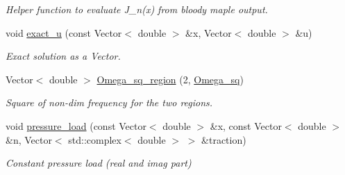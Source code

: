 \begin{DoxyCompactItemize}
\begin{DoxyCompactList}\small\item\em Helper function to evaluate J\+\_\+n(x) from bloody maple output. \end{DoxyCompactList}\item 
void \hyperlink{namespaceGlobal__Parameters_a97162dba4bd29a15067b9c9bbe53c754}{exact\+\_\+u} (const Vector$<$ double $>$ \&x, Vector$<$ double $>$ \&u)
\begin{DoxyCompactList}\small\item\em Exact solution as a Vector. \end{DoxyCompactList}\item 
Vector$<$ double $>$ \hyperlink{namespaceGlobal__Parameters_a58a76124a7c047adf58388cc12e84f23}{Omega\+\_\+sq\+\_\+region} (2, \hyperlink{namespaceGlobal__Parameters_af9e1e178dfb7f5e35b452599bd4c4324}{Omega\+\_\+sq})
\begin{DoxyCompactList}\small\item\em Square of non-\/dim frequency for the two regions. \end{DoxyCompactList}\item 
void \hyperlink{namespaceGlobal__Parameters_a0ddb3a77481b907fbb34f2e8d0a6eb9f}{pressure\+\_\+load} (const Vector$<$ double $>$ \&x, const Vector$<$ double $>$ \&n, Vector$<$ std\+::complex$<$ double $>$ $>$ \&traction)
\begin{DoxyCompactList}\small\item\em Constant pressure load (real and imag part) \end{DoxyCompactList}\end{DoxyCompactItemize}
